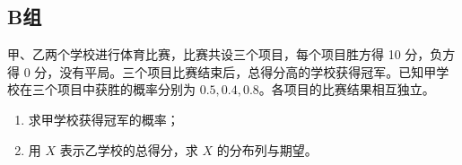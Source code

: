 \startexercise

\subsection*{B组}

\begin{exercise}[2022全国甲理19]
	甲、乙两个学校进行体育比赛，比赛共设三个项目，每个项目胜方得 10 分，负方得 0 分，没有平局。三个项目比赛结束后，总得分高的学校获得冠军。已知甲学校在三个项目中获胜的概率分别为 $0.5, 0.4, 0.8$。各项目的比赛结果相互独立。
	\begin{enumerate}
		\item[(1)] 求甲学校获得冠军的概率；
		\item[(2)] 用 $X$ 表示乙学校的总得分，求 $X$ 的分布列与期望。
	\end{enumerate}
\end{exercise}

\stopexercise
